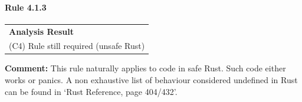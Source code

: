 \paragraph{Rule 4.1.3}
\begin{longtable}{p{13cm}}
\textbf{Analysis Result} \\
(C4) Rule still required (unsafe Rust) \\
\end{longtable}
\textbf{Comment:} This rule naturally applies to code in safe Rust. Such code either works or panics. A non exhaustive list of behaviour considered undefined in Rust can be found in `Rust Reference, page 404/432'. \\
